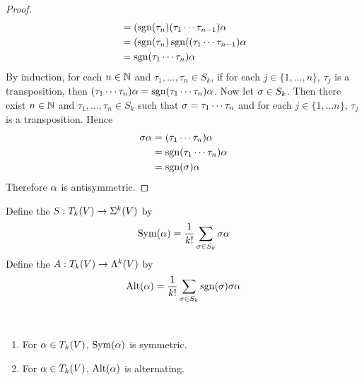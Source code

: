\documentclass{book}
\begin{document}
\begin{proof}
\begin{align*}
			& = (\operatorname{sgn}(\tau_n ) (\tau_1 \cdots \tau_{n-1}) \alpha \\
			& = (\operatorname{sgn}(\tau_n ) \operatorname{sgn}((\tau_1 \cdots \tau_{n-1}) \alpha \\
			& = \operatorname{sgn}(\tau_1 \cdots \tau_n) \alpha 
		\end{align*}
		By induction, for each $n \in \mathbb{N}$ and $\tau_1, \ldots, \tau_n \in S_k$, if for each $j \in \{1, \ldots, n\}$, $\tau_j$ is a transposition, then $(\tau_1 \cdots \tau_n) \alpha  = \operatorname{sgn}(\tau_1 \cdots \tau_n) \alpha$. Now let $\sigma \in S_k$. Then there exist $n \in \mathbb{N}$ and $\tau_1, \ldots, \tau_n \in S_k$ such that $\sigma = \tau_1 \cdots \tau_n$ and for each $j \in \{1, \ldots n\}$, $\tau_j$ is a transposition. Hence
		\begin{align*}
			\sigma \alpha 
			& = (\tau_1 \cdots \tau_n) \alpha \\
			& =  \operatorname{sgn}(\tau_1 \cdots \tau_n) \alpha \\
			& = \operatorname{sgn}(\sigma) \alpha
		\end{align*}
		Therefore $\alpha$ is antisymmetric.
	\end{proof}
	
	\begin{defn}
		Define the  $S: T_k(V) \rightarrow \Sigma^k(V)$ by $$\operatorname{Sym}(\alpha) = \frac{1}{k!}\sum_{\sigma \in S_k} \sigma \alpha$$  Define the  $A: T_k(V) \rightarrow \Lambda^k(V)$ by $$\operatorname{Alt}(\alpha) = \frac{1}{k!}\sum_{\sigma \in S_k} \operatorname{sgn}(\sigma)\sigma \alpha$$
	\end{defn}
	
	\begin{ex}\
		\begin{enumerate}
			\item For $\alpha \in T_k(V)$, $\operatorname{Sym}(\alpha)$ is symmetric.
			\item For $\alpha \in T_k(V)$, $\operatorname{Alt}(\alpha)$ is alternating.
		\end{enumerate}
	\end{ex}
\end{document}
